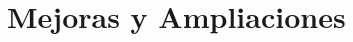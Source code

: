 \documentclass[a4paper]{article}
\begin{document}
    \section{Mejoras y Ampliaciones}
    
    
    
    
\end{document}
